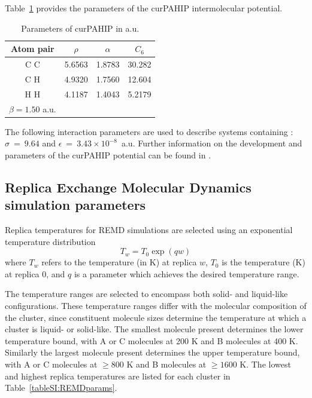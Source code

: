 Table~\ref{table:curPAHAPparams} provides the parameters of the curPAHIP intermolecular potential. 
%
\begin{table}[h!tb]
\centering
\caption{Parameters of curPAHIP in a.u.}
\label{table:curPAHAPparams}
\begin{tabular}{cccc}
\hline
Atom pair & $\rho $   & $\alpha$ 	&	$C_{6}$  \\ \hline
C C       & 5.6563 & 1.8783 & 30.282  \\
C H       & 4.9320 & 1.7560 & 12.604  \\
H H       & 4.1187 & 1.4043 & 5.2179  \\ \hline
$\beta = 1.50$ a.u.
\end{tabular}
\end{table}

The following interaction parameters are used to describe systems containing : $\sigma~=~9.64$ and $\epsilon~=~3.43\times10^{-8}$~a.u. Further information on the development and parameters of the curPAHIP potential can be found in \citet{bowal2019ion}.

\subsection{Replica Exchange Molecular Dynamics simulation parameters}
\label{secSI:REMDtemps}
%
Replica temperatures for REMD simulations are selected using an exponential temperature distribution
\begin{equation}
\label{eqn:replica_temp_dist}
T_{w} = T_{0}\exp(qw)
\end{equation}
where $T_w$ refers to the temperature (in K) at replica $w$, $T_0$ is the temperature (K) at replica $0$, and $q$ is a parameter which achieves the desired temperature range. 

The temperature ranges are selected to encompass both solid- and liquid-like configurations. These temperature ranges differ with the molecular composition of the cluster, since constituent molecule sizes determine the temperature at which a cluster is liquid- or solid-like. The smallest molecule present determines the lower temperature bound, with A or C molecules at 200 K and B molecules at 400 K. Similarly the largest molecule present determines the upper temperature bound, with A or C molecules at $\ge 800$ K and B molecules at $\ge 1600$ K. The lowest and highest replica temperatures are listed for each cluster in Table~\ref{tableSI:REMDparams}.

